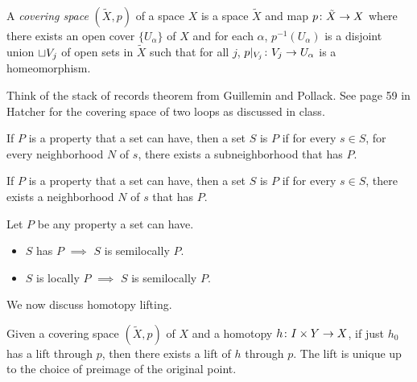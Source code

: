 \documentclass[11pt,leqno,oneside]{amsart}
\numberwithin{thm}{section}
\newcommand{\x}{\times}
\begin{document}
\begin{defn}
  A \emph{covering space} \((\tilde{X},p)\) of a space \(X\) is a space \(\tilde{X}\)
  and map \(p \colon \tilde{X} \to X\) where there exists an open cover
  \(\{U_\alpha\}\) of \(X\) and for each $\alpha$, \(p^{-1}(U_\alpha)\) is a
  disjoint union $\sqcup V_j$ of open sets in \(\tilde{X}\) such that for all $j$, $p|_{V_j} \colon V_j \to U_\alpha$ is a homeomorphism.
\end{defn}

Think of the stack of records theorem from Guillemin and Pollack. See
page 59 in Hatcher for the covering space of two loops as discussed in
class.

\begin{defn}
  If $P$ is a property that a set can have, then a set $S$ is  $P$ if for every $s \in S$, for every neighborhood $N$ of $s$, there exists a subneighborhood that has $P$.
\end{defn}
\begin{defn}
  If $P$ is a property that a set can have, then a set $S$ is  $P$ if for every $s \in S$, there exists a neighborhood $N$ of $s$ that has $P$.
\end{defn}
\begin{prop}
  Let $P$ be any property a set can have.
  \begin{itemize}
    \item $S$ has $P$ $\implies$ $S$ is semilocally $P$.
    \item $S$ is locally $P$ $\implies$ $S$ is semilocally $P$.
  \end{itemize}
\end{prop}

We now discuss homotopy lifting.

\begin{prop}
  Given a covering space \((\tilde{X},p)\) of \(X\) and a homotopy
  \(h \from I \x Y \to X\), if just $h_0$ has a lift through $p$, then there exists a lift of \(h\) through $p$.  The lift is unique up to the choice of preimage of the original point.
  \begin{center}
  \end{center}
\end{prop}
\end{document}
